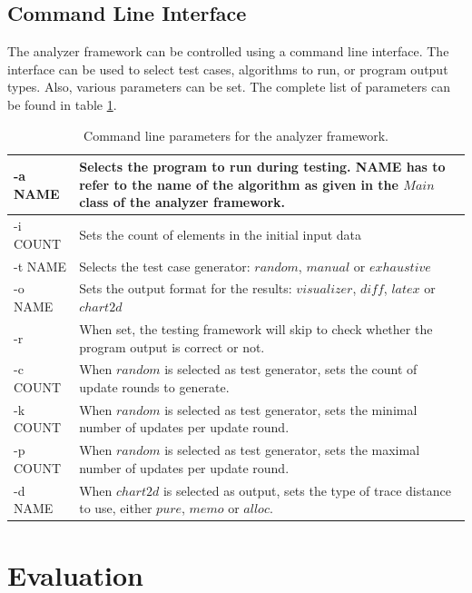 \section{Command Line Interface}

The analyzer framework can be controlled using a command line interface. The interface can be used to select test cases, algorithms to run, or program output types. Also, various parameters can be set. The complete list of parameters can be found in table \ref{tbl:commands}.

\begin{table}[h]
\centering
\begin{tabular}{|l|p{10cm}|}
\hline
-a NAME  & Selects the program to run during testing. NAME has to refer to the name of the algorithm as given in the $Main$ class of the analyzer framework. \\ \hline
-i COUNT & Sets the count of elements in the initial input data\\ \hline
-t NAME  & Selects the test case generator: $random$, $manual$ or $exhaustive$\\ \hline
-o NAME  & Sets the output format for the results: $visualizer$, $diff$, $latex$ or $chart2d$\\ \hline
-r & When set, the testing framework will skip to check whether the program output is correct or not. \\ \hline
-c COUNT & When $random$ is selected as test generator, sets the count of update rounds to generate. \\ \hline
-k COUNT & When $random$ is selected as test generator, sets the minimal number of updates per update round. \\ \hline
-p COUNT & When $random$ is selected as test generator, sets the maximal number of updates per update round. \\ \hline
-d NAME & When $chart2d$ is selected as output, sets the type of trace distance to use, either $pure$, $memo$ or $alloc$. \\ \hline
\end{tabular}
\caption{Command line parameters for the analyzer framework.}
\label{tbl:commands}
\end{table}

\chapter{Evaluation}
\label{ch:eval}

